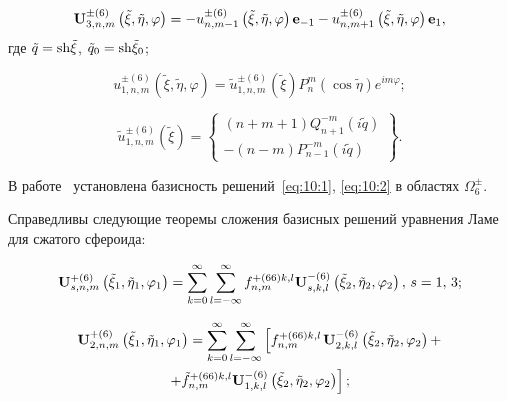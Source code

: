 \begin{equation}
{\bf{U}}_{3,n,m}^{ \pm (6)}\left( {\tilde \xi ,\tilde \eta ,\varphi } \right) =  - u_{n,m - 1}^{ \pm (6)}\left( {\tilde \xi ,\tilde \eta ,\varphi } \right){{\bf{e}}_{ - 1}} - u_{n,m + 1}^{ \pm (6)}\left( {\tilde \xi ,\tilde \eta ,\varphi } \right){{\bf{e}}_1},
\end{equation}
где $\tilde q = {\mathop{\rm sh}\nolimits} \tilde \xi $, ${\tilde q_0} = {\mathop{\rm sh}\nolimits} {\tilde \xi _0}$;

\begin{equation}
u_{1,n,m}^{ \pm (6)}\left( {\tilde \xi ,\tilde \eta ,\varphi } \right) = \tilde u_{1,n,m}^{ \pm (6)}(\tilde \xi )P_n^m(\cos \tilde \eta ){e^{im\varphi }};
\end{equation}

\begin{equation}
\tilde u_{1,n,m}^{ \pm (6)}(\tilde \xi ) = \left\{ \begin{array}{l}
(n + m + 1)Q_{n + 1}^{ - m}(i\tilde q)\\
 - (n - m)P_{n - 1}^{ - m}(i\tilde q)
\end{array} \right\}.
\end{equation}

В работе~\cite{Nikolaev1998} установлена базисность решений~\eqref{eq:10:1}, \eqref{eq:10:2} в областях $\Omega_6^\pm$.

Справедливы следующие теоремы сложения базисных решений уравнения Ламе для сжатого сфероида:

\begin{equation}
{\bf{U}}_{s,n,m}^{ + (6)}\left( {{{\tilde \xi }_1},{{\tilde \eta }_1},{\varphi _1}} \right) = \sum\limits_{k = 0}^\infty  {\sum\limits_{l =  - \infty }^\infty  {f_{n,m}^{ + (66)k,l}} } {\bf{U}}_{s,k,l}^{ - (6)}\left( {{{\tilde \xi }_2},{{\tilde \eta }_2},{\varphi _2}} \right),\,s = 1,{\mkern 1mu} {\kern 1pt} 3;
\label{eq:10:4}
\end{equation}

\begin{multline}
{\bf{U}}_{2,n,m}^{ + (6)}\left( {{{\tilde \xi }_1},{{\tilde \eta }_1},{\varphi _1}} \right) = \sum\limits_{k = 0}^\infty  {\sum\limits_{l =  - \infty }^\infty  {\left[ {f_{n,m}^{ + (66)k,l}} \right.} } {\bf{U}}_{2,k,l}^{ - (6)}\left( {{{\tilde \xi }_2},{{\tilde \eta }_2},{\varphi _2}} \right) + \\
\left. { + \tilde f_{n,m}^{ + (66)k,l}{\bf{U}}_{1,k,l}^{ - (6)}\left( {{{\tilde \xi }_2},{{\tilde \eta }_2},{\varphi _2}} \right)} \right];
\label{eq:10:5}
\end{multline}

